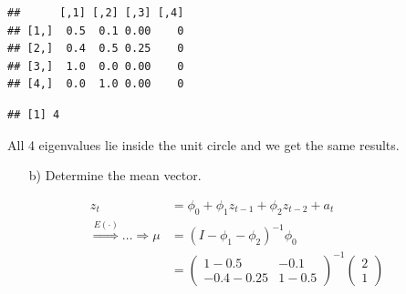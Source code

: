 \documentclass[12pt,a4paper]{article}
\newenvironment{Shaded}{\begin{snugshade}}{\end{snugshade}}
\newcommand{\CommentTok}[1]{\textcolor[rgb]{0.56,0.35,0.01}{\textit{#1}}}
\newcommand{\DecValTok}[1]{\textcolor[rgb]{0.00,0.00,0.81}{#1}}
\newcommand{\KeywordTok}[1]{\textcolor[rgb]{0.13,0.29,0.53}{\textbf{#1}}}
\newcommand{\NormalTok}[1]{#1}
\newcommand{\OperatorTok}[1]{\textcolor[rgb]{0.81,0.36,0.00}{\textbf{#1}}}
\newcommand{\StringTok}[1]{\textcolor[rgb]{0.31,0.60,0.02}{#1}}
\begin{document}
\begin{verbatim}
##      [,1] [,2] [,3] [,4]
## [1,]  0.5  0.1 0.00    0
## [2,]  0.4  0.5 0.25    0
## [3,]  1.0  0.0 0.00    0
## [4,]  0.0  1.0 0.00    0
\end{verbatim}

\begin{Shaded}
\end{Shaded}

\begin{verbatim}
## [1] 4
\end{verbatim}

All 4 eigenvalues lie inside the unit circle and we get the same
results.

\begin{itemize}
    \item[b)] Determine the mean vector.
\end{itemize}

\begin{align*}
  z_t & = \phi_0 + \phi_1 z_{t-1} + \phi_2 z_{t-2} +a_t\\
  \overset{E(\cdot)}{\Rightarrow} \ldots  \Rightarrow \mu & = \left( I - \phi_1 - \phi_2 \right)^{-1} \phi_0 \\  
  & = \begin{pmatrix}
  1 - 0.5 &  -0.1\\
  -0.4 - 0.25 & 1 - 0.5
  \end{pmatrix}^{-1}
   \begin{pmatrix}
  2\\
  1
  \end{pmatrix}
\end{align*}

\begin{Shaded}
\end{Shaded}
\end{document}
